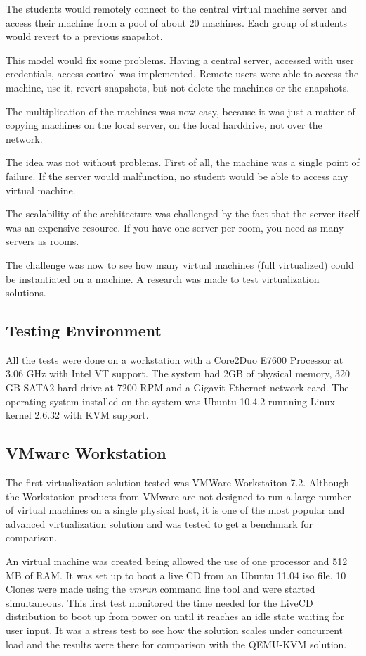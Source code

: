The students would remotely connect to the central virtual machine
server and access their machine from a pool of about 20 machines. Each
group of students would revert to a previous snapshot.

This model would fix some problems. Having a central server, accessed
with user credentials, access control was implemented. Remote users were
able to access the machine, use it, revert snapshots, but not delete the
machines or the snapshots.

The multiplication of the machines was now easy, because it was just a
matter of copying machines on the local server, on the local harddrive,
not over the network.

The idea was not without problems. First of all, the machine was a
single point of failure. If the server would malfunction, no student
would be able to access any virtual machine.

The scalability of the architecture was challenged by the fact that the
server itself was an expensive resource. If you have one server per
room, you need as many servers as rooms.

The challenge was now to see how many virtual machines (full
virtualized) could be instantiated on a machine. A research was made to
test virtualization solutions.

\subsection{Testing Environment}

All the tests were done on a workstation with a Core2Duo E7600 Processor
at 3.06 GHz with Intel VT support. The system had 2GB of physical memory,
320 GB SATA2 hard drive at 7200 RPM and a Gigavit Ethernet network card.
The operating system installed on the system was Ubuntu 10.4.2 runnning
Linux kernel 2.6.32 with KVM support.

\subsection{VMware Workstation}

The first virtualization solution tested was VMWare Workstaiton 7.2.
Although the Workstation products from VMware are not designed to run a
large number of virtual machines on a single physical host, it is one of
the most popular and advanced virtualization solution and was tested to get
a benchmark for comparison.

An virtual machine was created being allowed the use of one processor and
512 MB of RAM. It was set up to boot a live CD from an Ubuntu 11.04 iso
file. 10 Clones were made using the \emph{vmrun} command line tool and were
started simultaneous. This first test monitored the time needed for the
LiveCD distribution to boot up from power on until it reaches an idle state
waiting for user input. It was a stress test to see how the solution scales
under concurrent load and the results were there for comparison with the
QEMU-KVM solution.

